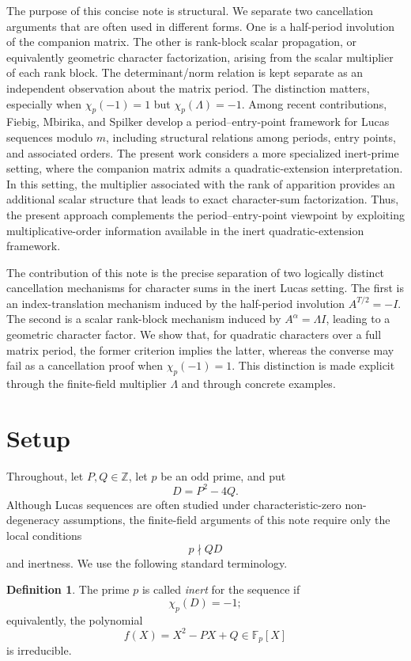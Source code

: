 \documentclass[11pt]{article}
\newcommand{\Fp}{\mathbb{F}_p}
\newcommand{\Z}{\mathbb{Z}}
\newcommand{\chiP}{\chi_p}
\theoremstyle{plain}
\theoremstyle{definition}
\newtheorem{definition}[theorem]{Definition}
\begin{document}
The purpose of this concise note is structural. We separate two cancellation
arguments that are often used in different forms. One is a half-period
involution of the companion matrix. The other is rank-block scalar
propagation, or equivalently geometric character factorization, arising from
the scalar multiplier of each rank block. The determinant/norm relation is
kept separate as an independent observation about the matrix period. The
distinction matters, especially when $\chiP(-1)=1$ but $\chiP(\Lambda)=-1$.
Among recent contributions, Fiebig, Mbirika, and Spilker
\cite{FiebigMbirikaSpilker2025} develop a period--entry-point framework for
Lucas sequences modulo $m$, including structural relations among periods,
entry points, and associated orders. The present work considers a more
specialized inert-prime setting, where the companion matrix admits a
quadratic-extension interpretation. In this setting, the multiplier
associated with the rank of apparition provides an additional scalar
structure that leads to exact character-sum factorization. Thus, the present
approach complements the period--entry-point viewpoint by exploiting
multiplicative-order information available in the inert quadratic-extension
framework.

The contribution of this note is the precise separation of two logically distinct cancellation mechanisms for character sums in the inert Lucas setting. The first is an index-translation mechanism induced by the half-period involution $A^{T/2}=-I$. The second is a scalar rank-block mechanism induced by $A^\alpha=\Lambda I$, leading to a geometric character factor. We show that, for quadratic characters over a full matrix period, the former criterion implies the latter, whereas the converse may fail as a cancellation proof when $\chi_p(-1)=1$. This distinction is made explicit through the finite-field multiplier $\Lambda$ and through concrete examples.

\section{Setup}

Throughout, let $P,Q\in\Z$, let $p$ be an odd prime, and put
\[
 D=P^2-4Q.
\]
Although Lucas sequences are often studied under characteristic-zero non-degeneracy assumptions, the finite-field arguments of this note require only the local conditions
\[
p\nmid QD
\]
and inertness. We use the following standard terminology.

\begin{definition}
The prime $p$ is called \emph{inert} for the sequence if
\[
 \chiP(D)=-1;
\]
equivalently, the polynomial
\[
 f(X)=X^2-PX+Q\in\Fp[X]
\]
is irreducible.
\end{definition}
\end{document}
